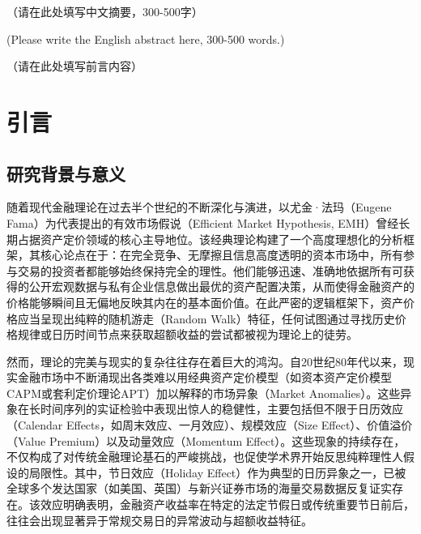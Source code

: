 \documentclass{cupb-thesis}
\begin{document}

\makecover

\makestatement

\begin{cnabstract}
（请在此处填写中文摘要，300-500字）
\end{cnabstract}

\begin{enabstract}
(Please write the English abstract here, 300-500 words.)
\end{enabstract}

\tableofcontents

\begin{preface}
（请在此处填写前言内容）
\end{preface}

\mainmatterstart


\chapter*{引言}


\section{研究背景与意义}


随着现代金融理论在过去半个世纪的不断深化与演进，以尤金·法玛（Eugene Fama）为代表提出的有效市场假说（Efficient Market Hypothesis, EMH）曾经长期占据资产定价领域的核心主导地位。该经典理论构建了一个高度理想化的分析框架，其核心论点在于：在完全竞争、无摩擦且信息高度透明的资本市场中，所有参与交易的投资者都能够始终保持完全的理性。他们能够迅速、准确地依据所有可获得的公开宏观数据与私有企业信息做出最优的资产配置决策，从而使得金融资产的价格能够瞬间且无偏地反映其内在的基本面价值。在此严密的逻辑框架下，资产价格应当呈现出纯粹的随机游走（Random Walk）特征，任何试图通过寻找历史价格规律或日历时间节点来获取超额收益的尝试都被视为理论上的徒劳。


然而，理论的完美与现实的复杂往往存在着巨大的鸿沟。自20世纪80年代以来，现实金融市场中不断涌现出各类难以用经典资产定价模型（如资本资产定价模型CAPM或套利定价理论APT）加以解释的市场异象（Market Anomalies）。这些异象在长时间序列的实证检验中表现出惊人的稳健性，主要包括但不限于日历效应（Calendar Effects，如周末效应、一月效应）、规模效应（Size Effect）、价值溢价（Value Premium）以及动量效应（Momentum Effect）。这些现象的持续存在，不仅构成了对传统金融理论基石的严峻挑战，也促使学术界开始反思纯粹理性人假设的局限性。其中，节日效应（Holiday Effect）作为典型的日历异象之一，已被全球多个发达国家（如美国、英国）与新兴证券市场的海量交易数据反复证实存在。该效应明确表明，金融资产收益率在特定的法定节假日或传统重要节日前后，往往会出现显著异于常规交易日的异常波动与超额收益特征。
\end{document}

